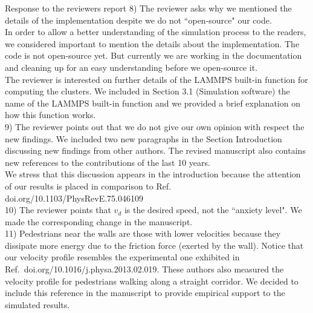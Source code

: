 \documentclass[a4paper,12pt]{letter}
\begin{document}
\begin{letter}{Response to the reviewers report}
{8) The reviewer asks why we mentioned the details of the implementation despite 
we do not ``open-source" our code. \\

In order to allow a better understanding of the simulation process to the readers, we 
considered important to mention the details about the implementation. The code is not open-source yet.
But currently we are working in the documentation and cleaning up for an easy understanding before we open-source it. \\

The reviewer is interested on further details of the LAMMPS built-in function for 
computing the clusters. We included in Section 3.1 (Simulation software) the name of the LAMMPS 
built-in function and we provided a brief explanation on how this function works. \\ 

9) The reviewer points out that we do not give our own opinion with respect
the new findings. We included two new paragraphs in the Section Introduction discussing new findings from other authors. The revised manuscript also contains new references to the contributions of the last 10 years.\\


We stress that this discussion appears in the introduction because the attention of our results is placed in comparison to Ref. doi.org/10.1103/PhysRevE.75.046109  \\ 


10) The reviewer points that $v_d$ is the desired speed, not the ``anxiety level". 
We made the corresponding change in the manuscript.\\

11) Pedestrians near the walls are those with lower velocities because they 
dissipate more energy due to the friction force (exerted by the wall).
Notice that our velocity profile resembles the experimental one
exhibited in  Ref.~doi.org/10.1016/j.physa.2013.02.019.
These authors also measured the velocity profile for
pedestrians walking along a straight corridor. We decided to
include this reference in the manuscript to provide empirical 
support to the simulated results. \\

}
\end{letter}
\end{document}
